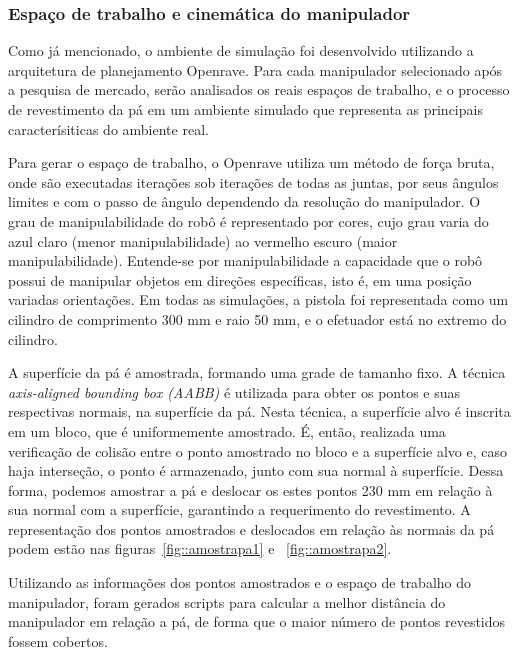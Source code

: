 \subsubsection{Espaço de trabalho e cinemática do manipulador}
Como já mencionado, o ambiente de simulação foi desenvolvido utilizando a
arquitetura de planejamento Openrave. Para cada manipulador selecionado após a
pesquisa de mercado, serão analisados os reais espaços de trabalho, e o processo de
revestimento da pá em um ambiente simulado que representa as principais
caracterísiticas do ambiente real.

Para gerar o espaço de trabalho, o Openrave utiliza um método de força bruta,
onde são executadas iterações sob iterações de todas as juntas, por seus ângulos
limites e com o passo de ângulo dependendo da resolução do manipulador. O grau
de manipulabilidade do robô é representado por cores, cujo grau varia do azul
claro (menor manipulabilidade) ao vermelho escuro (maior manipulabilidade).
Entende-se por manipulabilidade a capacidade que o robô possui de manipular
objetos em direções específicas, isto é, em uma posição variadas orientações. Em
todas as simulações, a pistola foi representada como um cilindro de comprimento
300 mm e raio 50 mm, e o efetuador está no extremo do cilindro.

A superfície da pá é amostrada, formando uma grade de tamanho fixo. A técnica
\textit{axis-aligned bounding box (AABB)} é utilizada para obter os
pontos e suas respectivas normais, na superfície da pá. Nesta técnica, a
superfície alvo é inscrita em um bloco, que é uniformemente amostrado. É, então,
realizada uma verificação de colisão entre o ponto amostrado no bloco e a
superfície alvo e, caso haja interseção, o ponto é armazenado, junto com sua
normal à superfície. Dessa forma, podemos amostrar a pá e deslocar os
estes pontos 230 mm em relação à sua normal com a superfície, garantindo a
requerimento do revestimento. A representação dos pontos amostrados e deslocados
em relação às normais da pá podem estão nas figuras~\ref{fig::amostrapa1} e
~\ref{fig::amostrapa2}. 

Utilizando as informações dos pontos amostrados e o espaço de trabalho do
manipulador, foram gerados scripts para calcular a
melhor distância do manipulador em relação a pá, de forma que o maior número de
pontos revestidos fossem cobertos.

